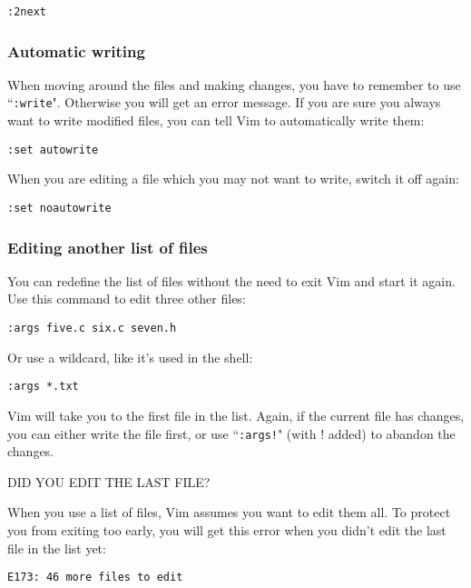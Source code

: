  \begin{Verbatim}[samepage=true]
 :2next
 \end{Verbatim}

\subsubsection{Automatic writing}
When moving around the files and making changes, you have to remember to use ``\texttt{:write}".
Otherwise you will get an error message.
If you are sure you always want to write modified files, you can tell Vim to automatically write them:

 \begin{Verbatim}[samepage=true]
 :set autowrite
 \end{Verbatim}

When you are editing a file which you may not want to write, switch it off again:

 \begin{Verbatim}[samepage=true]
 :set noautowrite
 \end{Verbatim}

\subsubsection{Editing another list of files}
You can redefine the list of files without the need to exit Vim and start it again.
Use this command to edit three other files:

 \begin{Verbatim}[samepage=true]
 :args five.c six.c seven.h
 \end{Verbatim}

Or use a wildcard, like it's used in the shell:

 \begin{Verbatim}[samepage=true]
 :args *.txt
 \end{Verbatim}

Vim will take you to the first file in the list.
Again, if the current file has changes, you can either write the file first, or use ``\texttt{:args!}" (with ! added) to abandon the changes.

DID YOU EDIT THE LAST FILE?
\label{arglist-quit}

When you use a list of files, Vim assumes you want to edit them all.
To protect you from exiting too early, you will get this error when you didn't edit the last file in the list yet:

		\begin{Verbatim}[samepage=true]
    E173: 46 more files to edit 
						\end{Verbatim}

